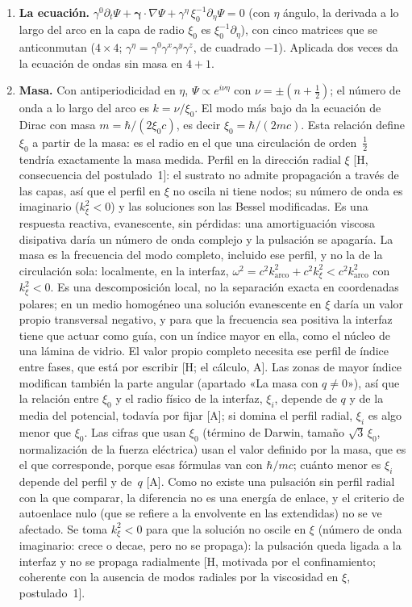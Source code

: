 \documentclass[11pt,a4paper]{article}
\newcommand{\st}[1]{\textup{[#1]}}
\newcommand{\vb}[1]{\symbf{#1}}
\begin{document}
\begin{enumerate}[label=\arabic*.,leftmargin=*]
\item \textbf{La ecuación.} $\gamma^0\partial_t\Psi+\vb{\gamma}\cdot\nabla\Psi+\gamma^\eta\,\xi_0^{-1}\partial_\eta\Psi=0$ (con $\eta$ ángulo, la derivada a lo largo del arco en la capa de radio $\xi_0$ es $\xi_0^{-1}\partial_\eta$), con cinco matrices que se anticonmutan ($4\times4$; $\gamma^\eta=\gamma^0\gamma^x\gamma^y\gamma^z$, de cuadrado $-1$). Aplicada dos veces da la ecuación de ondas sin masa en $4+1$.

\item \textbf{Masa.} Con antiperiodicidad en $\eta$, $\Psi\propto e^{i\nu\eta}$ con $\nu=\pm(n+\tfrac12)$; el número de onda a lo largo del arco es $k=\nu/\xi_0$. El modo más bajo da la ecuación de Dirac con masa $m=\hbar/(2\xi_0c)$, es decir $\xi_0=\hbar/(2mc)$. Esta relación define $\xi_0$ a partir de la masa: es el radio en el que una circulación de orden~$\tfrac12$ tendría exactamente la masa medida. Perfil en la dirección radial $\xi$ \st{H, consecuencia del postulado~1}: el sustrato no admite propagación a través de las capas, así que el perfil en $\xi$ no oscila ni tiene nodos; su número de onda es imaginario ($k_\xi^2<0$) y las soluciones son las Bessel modificadas. Es una respuesta reactiva, evanescente, sin pérdidas: una amortiguación viscosa disipativa daría un número de onda complejo y la pulsación se apagaría. La masa es la frecuencia del modo completo, incluido ese perfil, y no la de la circulación sola: localmente, en la interfaz, $\omega^2=c^2k_{\mathrm{arco}}^2+c^2k_\xi^2<c^2k_{\mathrm{arco}}^2$ con $k_\xi^2<0$. Es una descomposición local, no la separación exacta en coordenadas polares; en un medio homogéneo una solución evanescente en $\xi$ daría un valor propio transversal negativo, y para que la frecuencia sea positiva la interfaz tiene que actuar como guía, con un índice mayor en ella, como el núcleo de una lámina de vidrio. El valor propio completo necesita ese perfil de índice entre fases, que está por escribir \st{H; el cálculo, A}. Las zonas de mayor índice modifican también la parte angular (apartado «La masa con $q\neq0$»), así que la relación entre $\xi_0$ y el radio físico de la interfaz, $\xi_i$, depende de $q$ y de la media del potencial, todavía por fijar \st{A}; si domina el perfil radial, $\xi_i$ es algo menor que $\xi_0$. Las cifras que usan $\xi_0$ (término de Darwin, tamaño $\sqrt3\,\xi_0$, normalización de la fuerza eléctrica) usan el valor definido por la masa, que es el que corresponde, porque esas fórmulas van con $\hbar/mc$; cuánto menor es $\xi_i$ depende del perfil y de~$q$ \st{A}. Como no existe una pulsación sin perfil radial con la que comparar, la diferencia no es una energía de enlace, y el criterio de autoenlace nulo (que se refiere a la envolvente en las extendidas) no se ve afectado. Se toma $k_\xi^2<0$ para que la solución no oscile en $\xi$ (número de onda imaginario: crece o decae, pero no se propaga): la pulsación queda ligada a la interfaz y no se propaga radialmente \st{H, motivada por el confinamiento; coherente con la ausencia de modos radiales por la viscosidad en $\xi$, postulado~1}.


\end{enumerate}
\end{document}
